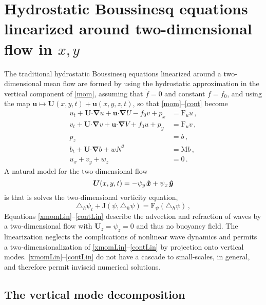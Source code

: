 \documentclass[12pt, oneside]{article}
\newcommand{\com}{\, ,}
\newcommand{\per}{\, .}
\newcommand{\beq}{\begin{equation}}
\newcommand{\eeq}{\end{equation}}
\newcommand{\bnabla}{\boldsymbol \nabla}
\newcommand{\bcdot}{\boldsymbol \cdot}
\newcommand{\hlap}{\triangle_h}
\newcommand{\bu}{\boldsymbol u}
\newcommand{\bxh}{\hspace{0.1em} \boldsymbol{\hat x}}
\newcommand{\byh}{\hspace{0.1em}\boldsymbol{\hat y}}
\newcommand{\bU}{\boldsymbol{U}}
\newcommand{\J}{\mathrm{J}}
\newcommand{\fh}{\breve f}
\newcommand{\friction}{\mathrm{F}}
\newcommand{\mixing}{\mathrm{M}}
\begin{document}
\section{Hydrostatic Boussinesq equations linearized around two-dimensional flow in $x,y$}

The traditional hydrostatic Boussinesq equations linearized around a two-dimensional mean flow are formed by using the hydrostatic approximation in the vertical component of \eqref{mom}, assuming that $\fh = 0$ and constant $f = f_0$, and using the map $\bu \mapsto \bU(x, y, t) + \bu(x, y, z, t)$, so that \eqref{mom}--\eqref{cont} become
\begin{align}
u_t + \bU \bcdot \bnabla u + \bu \bcdot \bnabla U - f_0 v + p_x &= \friction_u u \com \label{xmomLin} \\
v_t + \bU \bcdot \bnabla v + \bu \bcdot \bnabla V + f_0 u + p_y &= \friction_u v \com \label{ymomLin} \\
p_z &= b \com \label{zmomLin} \\
b_t + \bU \bcdot \bnabla b + w N^2 &= \mixing b \com \label{buoyLin} \\
u_x + v_y + w_z &= 0 \label{contLin} \per
\end{align}
A natural model for the two-dimensional flow
\beq
\bU(x,y,t) = - \psi_y \bxh + \psi_x \byh
\label{streamfunctionDef}
\eeq
is that is solves the two-dimensional vorticity equation,
\beq
\hlap \psi_t + \J \left ( \psi , \hlap \psi \right ) = \friction_\psi \left ( \hlap \psi \right ) \com
\label{vorticity}
\eeq
Equations \eqref{xmomLin}--\eqref{contLin} describe the advection and refraction of waves by a two-dimensional flow with $\bU_{\! z} = \psi_z = 0$ and thus no buoyancy field.  The linearization neglects the complications of nonlinear wave dynamics and permits a two-dimensionalization of \eqref{xmomLin}--\eqref{contLin} by projection onto vertical modes. \eqref{xmomLin}--\eqref{contLin} do not have a cascade to small-scales, in general, and therefore permit inviscid numerical solutions.

\subsection{The vertical mode decomposition}
\label{verticalModeProjection}
\end{document}

